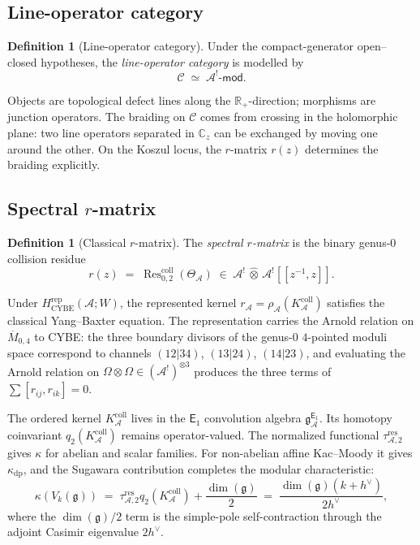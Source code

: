 \documentclass[11pt,reqno]{amsart}
\theoremstyle{definition}
\newtheorem{definition}[theorem]{Definition}
\theoremstyle{remark}
\newcommand{\cA}{\mathcal{A}}
\newcommand{\cC}{\mathcal{C}}
\newcommand{\Eone}{\mathsf{E}_{1}}
\newcommand{\fg}{\mathfrak{g}}
\newcommand{\bC}{\mathbb{C}}
\newcommand{\bR}{\mathbb{R}}
\DeclareMathOperator{\Res}{Res}
\DeclareMathOperator{\coll}{coll}
\numberwithin{equation}{section}
\begin{document}
\subsection{Line-operator category}\label{subsec:lines}

\begin{definition}[Line-operator category]\label{def:lines}
Under the compact-generator open--closed hypotheses, the
\emph{line-operator category} is modelled by
\begin{equation}\label{eq:lines}
\cC \;\simeq\; \cA^!\text{-}\mathsf{mod}.
\end{equation}
\end{definition}

Objects are topological defect lines along the $\bR_+$-direction;
morphisms are junction operators. The braiding on $\cC$ comes from
crossing in the holomorphic plane: two line operators separated in
$\bC_z$ can be exchanged by moving one around the other. On the
Koszul locus, the $r$-matrix $r(z)$ determines the braiding
explicitly.


\subsection{Spectral $r$-matrix}\label{subsec:r-matrix}

\begin{definition}[Classical $r$-matrix]\label{def:r-matrix}
The \emph{spectral $r$-matrix} is the binary genus-$0$ collision
residue
\begin{equation}\label{eq:r-matrix}
r(z) \;=\; \Res^{\coll}_{0,2}(\Theta_{\cA})
\;\in\;
\cA^! \,\widehat{\otimes}\, \cA^![\![z^{-1}, z]\!].
\end{equation}
\end{definition}

Under $H_{\mathrm{CYBE}}^{\mathrm{rep}}(\cA;W)$, the represented
kernel $r_\cA=\rho_\cA(K_\cA^{\mathrm{coll}})$ satisfies the classical
Yang--Baxter equation. The representation carries the Arnold
relation on $\overline{M}_{0,4}$ to CYBE: the
three boundary divisors of the genus-$0$ $4$-pointed moduli space
correspond to channels $(12|34)$, $(13|24)$, $(14|23)$, and evaluating
the Arnold relation on
$\Omega \otimes \Omega \in (\cA^!)^{\otimes 3}$ produces the
three terms of $\sum [r_{ij}, r_{ik}] = 0$.

The ordered kernel $K_\cA^{\mathrm{coll}}$ lives in the $\Eone$
convolution algebra $\mathfrak{g}^{\Eone}_{\cA}$. Its homotopy
coinvariant $q_2(K_\cA^{\mathrm{coll}})$ remains operator-valued.
The normalized functional $\tau_{\cA,2}^{\mathrm{res}}$ gives
$\kappa$ for abelian and scalar families. For non-abelian affine
Kac--Moody it gives $\kappa_{\mathrm{dp}}$, and the Sugawara
contribution completes the modular characteristic:
\begin{equation}\label{eq:av-sugawara}
\kappa(V_k(\fg))
\;=\;
\tau_{\cA,2}^{\mathrm{res}}q_2(K_\cA^{\mathrm{coll}})
+ \frac{\dim(\fg)}{2}
\;=\;
\frac{\dim(\fg)(k + h^\vee)}{2h^\vee},
\end{equation}
where the $\dim(\fg)/2$ term is the simple-pole self-contraction
through the adjoint Casimir eigenvalue $2h^\vee$.
\end{document}
